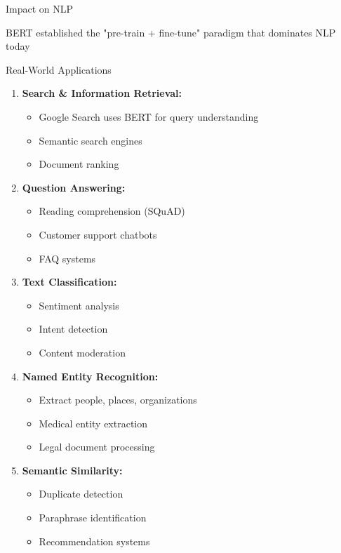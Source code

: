 \documentclass[aspectratio=169]{beamer}
\begin{document}
\begin{frame}[shrink=10]{Impact on NLP 🌟}
\vspace{1em}
\begin{center}
\alert{BERT established the "pre-train + fine-tune" paradigm that dominates NLP today}
\end{center}
\end{frame}

\begin{frame}[shrink=10]{Real-World Applications 🚀}
\begin{enumerate}\setlength{\itemsep}{0pt}
    \item \textbf{Search \& Information Retrieval:}
    \begin{itemize}\setlength{\itemsep}{0pt}
        \item Google Search uses BERT for query understanding
        \item Semantic search engines
        \item Document ranking
    \end{itemize}

    \item \textbf{Question Answering:}
    \begin{itemize}\setlength{\itemsep}{0pt}
        \item Reading comprehension (SQuAD)
        \item Customer support chatbots
        \item FAQ systems
    \end{itemize}

    \item \textbf{Text Classification:}
    \begin{itemize}\setlength{\itemsep}{0pt}
        \item Sentiment analysis
        \item Intent detection
        \item Content moderation
    \end{itemize}

    \item \textbf{Named Entity Recognition:}
    \begin{itemize}\setlength{\itemsep}{0pt}
        \item Extract people, places, organizations
        \item Medical entity extraction
        \item Legal document processing
    \end{itemize}

    \item \textbf{Semantic Similarity:}
    \begin{itemize}\setlength{\itemsep}{0pt}
        \item Duplicate detection
        \item Paraphrase identification
        \item Recommendation systems
    \end{itemize}
\end{enumerate}
\end{frame}
\end{document}
